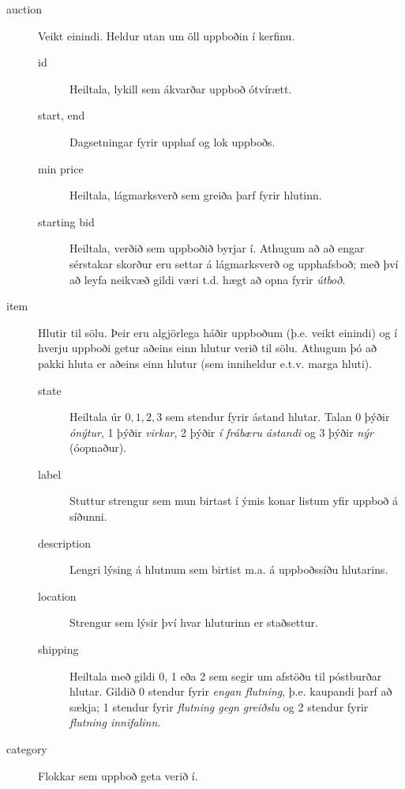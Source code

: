 \documentclass[a4paper,icelandic]{article}
\theoremstyle{definition} \newtheorem{skilgr}{Skilgreining}
\theoremstyle{plain}      \newtheorem{setn}{Setning}
\theoremstyle{remark}     \newtheorem*{lausn}{Lausn}
\begin{document}
\begin{description}
\begin{description}
        \end{description}
    \item[auction] Veikt einindi. Heldur utan um öll uppboðin í kerfinu.
        \begin{description}
            \item[id] Heiltala, lykill sem ákvarðar uppboð ótvírætt.
            \item[start, end] Dagsetningar fyrir upphaf og lok uppboðs.
            \item[min price] Heiltala, lágmarksverð sem greiða þarf fyrir
                hlutinn.
            \item[starting bid] Heiltala, verðið sem uppboðið byrjar í. Athugum
                að að engar sérstakar skorður eru settar á lágmarksverð og
                upphafsboð; með því að leyfa neikvæð gildi væri t.d. hægt að
                opna fyrir \emph{útboð}. 
        \end{description}
    \item[item] Hlutir til sölu. Þeir eru algjörlega háðir uppboðum (þ.e. veikt
        einindi) og í hverju uppboði getur aðeins einn hlutur verið til sölu.
        Athugum þó að pakki hluta er aðeins einn hlutur (sem inniheldur e.t.v.
        marga hluti).
        \begin{description}
            \item[state] Heiltala úr $0,1,2,3$ sem stendur fyrir ástand hlutar.
                Talan 0 þýðir \emph{ónýtur}, 1 þýðir \emph{virkar}, 2 þýðir
                \emph{í frábæru ástandi} og 3 þýðir \emph{nýr} (óopnaður).
            \item[label] Stuttur strengur sem mun birtast í ýmis konar listum
                yfir uppboð á síðunni.
            \item[description] Lengri lýsing á hlutnum sem birtist m.a. á
                uppboðssíðu hlutarins.
            \item[location] Strengur sem lýsir því hvar hluturinn er staðsettur. 
            \item[shipping] Heiltala með gildi 0, 1 eða 2 sem segir um afstöðu
                til póstburðar hlutar. Gildið 0 stendur fyrir \emph{engan
                flutning}, þ.e. kaupandi þarf að sækja; 1 stendur fyrir
                \emph{flutning gegn greiðslu} og 2 stendur fyrir
                \emph{flutning innifalinn}.
        \end{description}
    \item[category] Flokkar sem uppboð geta verið í.
        \begin{description}

\end{description}
\end{description}
\end{document}
